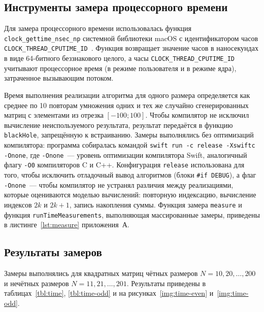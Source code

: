 \subsection{Инструменты замера процессорного времени}
\label{sec:time-tools}
Для замера процессорного времени использовалась функция \texttt{clock\_gettime\_nsec\_np} системной библиотеки macOS с идентификатором часов \texttt{CLOCK\_THREAD\_CPUTIME\_ID}~\cite{clock-gettime}. Функция возвращает значение часов в наносекундах в виде 64-битного беззнакового целого, а часы \texttt{CLOCK\_THREAD\_CPUTIME\_ID} учитывают процессорное время (в режиме пользователя и в режиме ядра), затраченное вызывающим потоком.

Время выполнения реализации алгоритма для одного размера определяется как среднее по 10 повторам умножения одних и тех же случайно сгенерированных матриц с элементами из отрезка $[-100; 100]$. Чтобы компилятор не исключил вычисление неиспользуемого результата, результат передаётся в функцию \texttt{blackHole}, запрещённую к встраиванию. Замеры выполнялись без оптимизаций компилятора: программа собиралась командой \texttt{swift run -c release -Xswiftc -Onone}, где \texttt{-Onone}~--- уровень оптимизации компилятора Swift, аналогичный флагу \texttt{-O0} компиляторов C и C++. Конфигурация \texttt{release} использована для того, чтобы исключить отладочный вывод алгоритмов (блоки \texttt{\#if DEBUG}), а флаг \texttt{-Onone}~--- чтобы компилятор не устранял различия между реализациями, которые оцениваются моделью вычислений: повторную индексацию, вычисление индексов $2k$ и $2k + 1$, запись накопления суммы. Функция замера \texttt{measure} и функция \texttt{runTimeMeasurements}, выполняющая массированные замеры, приведены в листинге~\ref{lst:measure} приложения~А.

\subsection{Результаты замеров}
Замеры выполнялись для квадратных матриц чётных размеров $N = 10, 20, \ldots, 200$ и нечётных размеров $N = 11, 21, \ldots, 201$. Результаты приведены в таблицах~\ref{tbl:time}, \ref{tbl:time-odd} и на рисунках~\ref{img:time-even} и~\ref{img:time-odd}.



